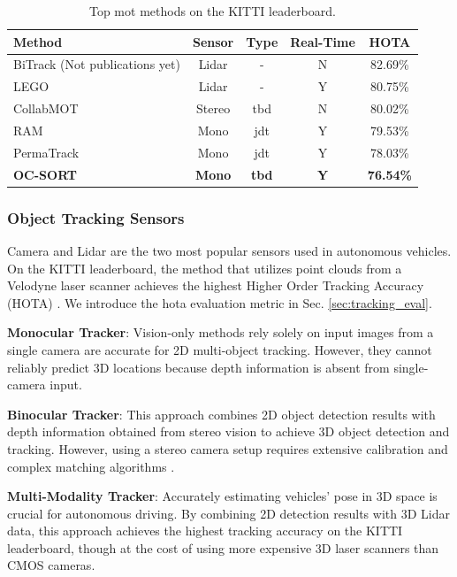 \begin{table}[t]
\centering
\begin{tabular}{ lcccc } 
\hline
Method & Sensor & Type & Real-Time & HOTA    \\
\hline
BiTrack (Not publications yet) &    Lidar   &      -         & N & 82.69\% \\ 
LEGO \citep{zhang2023lego}   &    Lidar   &      -         & Y  & 80.75\% \\ 
CollabMOT \citep{ninh2024collabmot}   &    Stereo   &      \acrshort{tbd}         & N  & 80.02\% \\ 
RAM \citep{tokmakov2022object}    &    Mono  & \acrshort{jdt} & Y  & 79.53\% \\ 
PermaTrack \citep{tokmakov2021learning} & Mono  & \acrshort{jdt} & Y  & 78.03\% \\ 
\textbf{OC-SORT \citep{cao2023observation}}    & \textbf{Mono}  & \textbf{\acrshort{tbd}} & \textbf{Y}  & \textbf{76.54\%} \\ 
\hline
\end{tabular}
\caption{Top \acrfull{mot} methods on the KITTI leaderboard.}
\label{tab.mot}
\end{table}

\subsubsection{Object Tracking Sensors}

Camera and Lidar are the two most popular sensors used in autonomous vehicles. On the KITTI leaderboard, the method that utilizes point clouds from a Velodyne laser scanner achieves the highest Higher Order Tracking Accuracy (HOTA) \citep{Luiten2020IJCV}. We introduce the \acrshort{hota} evaluation metric in Sec. \ref{sec:tracking_eval}.

\textbf{Monocular Tracker}:  Vision-only methods rely solely on input images from a single camera \citep{wu2021track} \citep{hu2022monocular} are accurate for 2D multi-object tracking. However, they cannot reliably predict 3D locations because depth information is absent from single-camera input.

\textbf{Binocular Tracker}: This approach combines 2D object detection results with depth information obtained from stereo vision to achieve 3D object detection and tracking. However, using a stereo camera setup requires extensive calibration and complex matching algorithms \citep{ninh2024collabmot}.

\textbf{Multi-Modality Tracker}: Accurately estimating vehicles' pose in 3D space is crucial for autonomous driving. By combining 2D detection results with 3D Lidar data, this approach achieves the highest tracking accuracy on the KITTI leaderboard, though at the cost of using more expensive 3D laser scanners than CMOS cameras.

